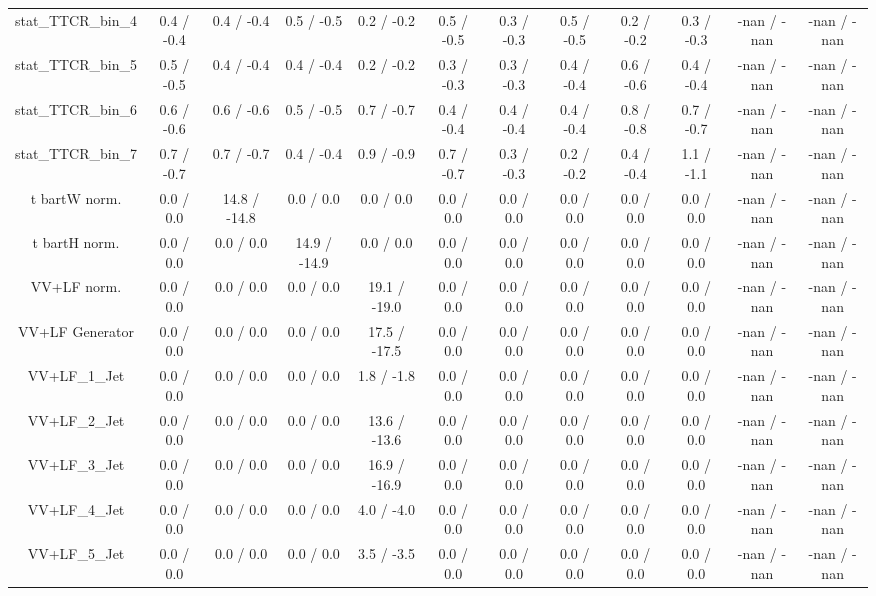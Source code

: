\begin{table}[htbp]
\begin{center}
\begin{tabular}{|c|c|c|c|c|c|c|c|c|c|c|c|}
 stat_TTCR_bin_4 & 0.4 / -0.4 & 0.4 / -0.4 & 0.5 / -0.5 & 0.2 / -0.2 & 0.5 / -0.5 & 0.3 / -0.3 & 0.5 / -0.5 & 0.2 / -0.2 & 0.3 / -0.3 & -nan / -nan & -nan / -nan \\ 
 stat_TTCR_bin_5 & 0.5 / -0.5 & 0.4 / -0.4 & 0.4 / -0.4 & 0.2 / -0.2 & 0.3 / -0.3 & 0.3 / -0.3 & 0.4 / -0.4 & 0.6 / -0.6 & 0.4 / -0.4 & -nan / -nan & -nan / -nan \\ 
 stat_TTCR_bin_6 & 0.6 / -0.6 & 0.6 / -0.6 & 0.5 / -0.5 & 0.7 / -0.7 & 0.4 / -0.4 & 0.4 / -0.4 & 0.4 / -0.4 & 0.8 / -0.8 & 0.7 / -0.7 & -nan / -nan & -nan / -nan \\ 
 stat_TTCR_bin_7 & 0.7 / -0.7 & 0.7 / -0.7 & 0.4 / -0.4 & 0.9 / -0.9 & 0.7 / -0.7 & 0.3 / -0.3 & 0.2 / -0.2 & 0.4 / -0.4 & 1.1 / -1.1 & -nan / -nan & -nan / -nan \\ 
  t bar{t}W norm. & 0.0 / 0.0 & 14.8 / -14.8 & 0.0 / 0.0 & 0.0 / 0.0 & 0.0 / 0.0 & 0.0 / 0.0 & 0.0 / 0.0 & 0.0 / 0.0 & 0.0 / 0.0 & -nan / -nan & -nan / -nan \\ 
  t bar{t}H norm. & 0.0 / 0.0 & 0.0 / 0.0 & 14.9 / -14.9 & 0.0 / 0.0 & 0.0 / 0.0 & 0.0 / 0.0 & 0.0 / 0.0 & 0.0 / 0.0 & 0.0 / 0.0 & -nan / -nan & -nan / -nan \\ 
  VV+LF norm. & 0.0 / 0.0 & 0.0 / 0.0 & 0.0 / 0.0 & 19.1 / -19.0 & 0.0 / 0.0 & 0.0 / 0.0 & 0.0 / 0.0 & 0.0 / 0.0 & 0.0 / 0.0 & -nan / -nan & -nan / -nan \\ 
  VV+LF Generator & 0.0 / 0.0 & 0.0 / 0.0 & 0.0 / 0.0 & 17.5 / -17.5 & 0.0 / 0.0 & 0.0 / 0.0 & 0.0 / 0.0 & 0.0 / 0.0 & 0.0 / 0.0 & -nan / -nan & -nan / -nan \\ 
  VV+LF_1_Jet & 0.0 / 0.0 & 0.0 / 0.0 & 0.0 / 0.0 & 1.8 / -1.8 & 0.0 / 0.0 & 0.0 / 0.0 & 0.0 / 0.0 & 0.0 / 0.0 & 0.0 / 0.0 & -nan / -nan & -nan / -nan \\ 
  VV+LF_2_Jet & 0.0 / 0.0 & 0.0 / 0.0 & 0.0 / 0.0 & 13.6 / -13.6 & 0.0 / 0.0 & 0.0 / 0.0 & 0.0 / 0.0 & 0.0 / 0.0 & 0.0 / 0.0 & -nan / -nan & -nan / -nan \\ 
  VV+LF_3_Jet & 0.0 / 0.0 & 0.0 / 0.0 & 0.0 / 0.0 & 16.9 / -16.9 & 0.0 / 0.0 & 0.0 / 0.0 & 0.0 / 0.0 & 0.0 / 0.0 & 0.0 / 0.0 & -nan / -nan & -nan / -nan \\ 
  VV+LF_4_Jet & 0.0 / 0.0 & 0.0 / 0.0 & 0.0 / 0.0 & 4.0 / -4.0 & 0.0 / 0.0 & 0.0 / 0.0 & 0.0 / 0.0 & 0.0 / 0.0 & 0.0 / 0.0 & -nan / -nan & -nan / -nan \\ 
  VV+LF_5_Jet & 0.0 / 0.0 & 0.0 / 0.0 & 0.0 / 0.0 & 3.5 / -3.5 & 0.0 / 0.0 & 0.0 / 0.0 & 0.0 / 0.0 & 0.0 / 0.0 & 0.0 / 0.0 & -nan / -nan & -nan / -nan \\ 

\end{tabular}
\end{center}
\end{table}
